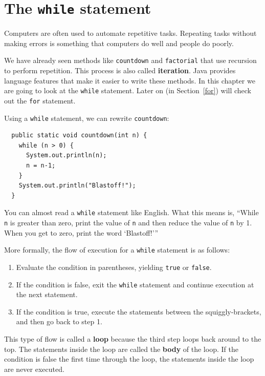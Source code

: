 \documentclass[12pt]{book}
\theoremstyle{exercise}
\begin{document}
\section{The {\tt while} statement}

Computers are often used to automate repetitive tasks.  Repeating
tasks without making errors is something that
computers do well and people do poorly.

We have already seen methods like {\tt countdown} and {\tt factorial}
that use recursion to perform repetition. This process is also called
{\bf iteration}. Java provides language features that make
it easier to write these methods.
In this chapter we are going to look at the {\tt while} statement.
Later on (in Section~\ref{for}) will check out the {\tt for} statement.

Using a {\tt while} statement, we can rewrite {\tt countdown}:

\begin{lstlisting}
  public static void countdown(int n) {
    while (n > 0) {
      System.out.println(n);
      n = n-1;
    }
    System.out.println("Blastoff!");
  }
\end{lstlisting}
%
You can almost read a {\tt while} statement like
English.  What this means is, ``While {\tt n} is greater than
zero, print the value of {\tt n} and then reduce
the value of {\tt n} by 1.  When you get to zero, print the
word `Blastoff!'''

More formally, the flow of execution for a {\tt while} statement
is as follows:

\begin{enumerate}

\item Evaluate the condition in parentheses, yielding {\tt true}
or {\tt false}.

\item If the condition is false, exit the {\tt while} statement
and continue execution at the next statement.

\item If the condition is true, execute the statements
between the squiggly-brackets, and then go back to step 1.

\end{enumerate}

This type of flow is called a {\bf loop} because the third step loops
back around to the top.  The statements inside the loop are called
the {\bf body} of the loop.
%
If the condition is false the
first time through the loop, the statements inside the loop are
never executed.
\end{document}
